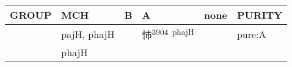 \documentclass[14pt,a4paper]{scrartcl}
\begin{document}
\begin{longtable}[c]{@{}llllll@{}}
\toprule
\begin{minipage}[b]{0.14\columnwidth}\raggedright\strut
GROUP
\strut\end{minipage} &
\begin{minipage}[b]{0.14\columnwidth}\raggedright\strut
MCH
\strut\end{minipage} &
\begin{minipage}[b]{0.14\columnwidth}\raggedright\strut
B
\strut\end{minipage} &
\begin{minipage}[b]{0.14\columnwidth}\raggedright\strut
A
\strut\end{minipage} &
\begin{minipage}[b]{0.14\columnwidth}\raggedright\strut
none
\strut\end{minipage} &
\begin{minipage}[b]{0.14\columnwidth}\raggedright\strut
PURITY
\strut\end{minipage}\tabularnewline
\midrule
\endhead
\begin{minipage}[t]{0.14\columnwidth}\raggedright\strut
𣎵
\strut\end{minipage} &
\begin{minipage}[t]{0.14\columnwidth}\raggedright\strut
pajH, phajH
\strut\end{minipage} &
\begin{minipage}[t]{0.14\columnwidth}\raggedright\strut
\strut\end{minipage} &
\begin{minipage}[t]{0.14\columnwidth}\raggedright\strut
㤄\textsuperscript{3904~phajH}
\strut\end{minipage} &
\begin{minipage}[t]{0.14\columnwidth}\raggedright\strut
\strut\end{minipage} &
\begin{minipage}[t]{0.14\columnwidth}\raggedright\strut
pure:A
\strut\end{minipage}\tabularnewline
\begin{minipage}[t]{0.14\columnwidth}\raggedright\strut
𣎳
\strut\end{minipage} &
\begin{minipage}[t]{0.14\columnwidth}\raggedright\strut
phajH
\strut\end{minipage} &
\begin{minipage}[t]{0.14\columnwidth}\raggedright\strut
\strut\end{minipage} &

\end{longtable}
\end{document}
